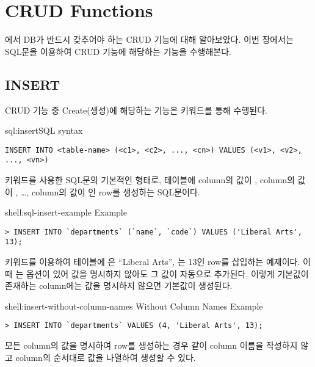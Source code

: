 \section{CRUD Functions}\label{sect:crud}

에서 DB가 반드시 갖추어야 하는 CRUD 기능에 대해 알아보았다. 이번 장에서는 SQL문을 이용하여 CRUD 기능에 해당하는 기능을 수행해본다.

\subsection*{INSERT}

CRUD 기능 중 Create(생성)에 해당하는 기능은  키워드를 통해 수행된다.

\begin{sqlenv}{sql:insert}{SQL  syntax}\begin{verbatim}
INSERT INTO <table-name> (<c1>, <c2>, ..., <cn>) VALUES (<v1>, <v2>, ..., <vn>)
\end{verbatim}
\end{sqlenv}

\는  키워드를 사용한 SQL문의 기본적인 형태로,  테이블에  column의 값이 ,  column의 값이 , \ldots,  column의 값이 인 row를 생성하는 SQL문이다.

\begin{shellenv}{shell:sql-insert-example}{ Example}\begin{verbatim}
> INSERT INTO `departments` (`name`, `code`) VALUES ('Liberal Arts', 13);
\end{verbatim}
\end{shellenv}

\은  키워드를 이용하여  테이블에 은 ``Liberal Arts'', 는 13인 row를 삽입하는 예제이다. 이때 는  옵션이 있어 값을 명시하지 않아도 그 값이 자동으로 추가된다. 이렇게 기본값이 존재하는 column에는 값을 명시하지 않으면 기본값이 생성된다.

\begin{shellenv}{shell:insert-without-column-names}{ Without Column Names Example}\begin{verbatim}
> INSERT INTO `departments` VALUES (4, 'Liberal Arts', 13);
\end{verbatim}
\end{shellenv}

모든 column의 값을 명시하여 row를 생성하는 경우 \와 같이 column 이름을 작성하지 않고 column의 순서대로 값을 나열하여 생성할 수 있다.

